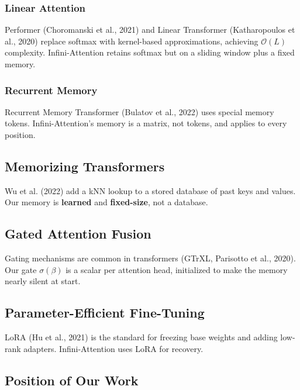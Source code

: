 \subsubsection{Linear Attention}

Performer (Choromanski et al., 2021) and Linear Transformer (Katharopoulos 
et al., 2020) replace softmax with kernel-based approximations, achieving 
$\mathcal{O}(L)$ complexity. Infini-Attention retains softmax but on a 
sliding window plus a fixed memory.

\subsubsection{Recurrent Memory}

Recurrent Memory Transformer (Bulatov et al., 2022) uses special memory 
tokens. Infini-Attention's memory is a matrix, not tokens, and applies to 
every position.

\subsection{Memorizing Transformers}

Wu et al. (2022) add a kNN lookup to a stored database of past keys and 
values. Our memory is \textbf{learned} and \textbf{fixed-size}, not a database.

\subsection{Gated Attention Fusion}

Gating mechanisms are common in transformers (GTrXL, Parisotto et al., 2020). 
Our gate $\sigma(\beta)$ is a scalar per attention head, initialized to make 
the memory nearly silent at start.

\subsection{Parameter-Efficient Fine-Tuning}

LoRA (Hu et al., 2021) is the standard for freezing base weights and adding 
low-rank adapters. Infini-Attention uses LoRA for recovery.

\subsection{Position of Our Work}

